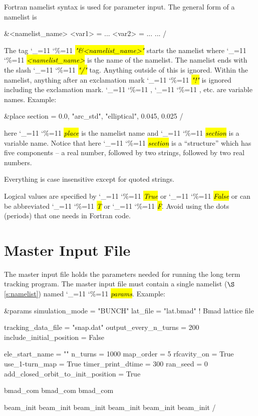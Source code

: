 \documentclass{hitec}
\newcommand\dottcmd[1]{\hl{\em#1}\endgroup}
\newcommand{\vn}{\begingroup\catcode`\_=11 \catcode`\%=11 \dottcmd}
\newcommand{\sref}[1]{$\S$\ref{#1}}
\newcommand{\Section}[1]{\section{#1}\vspace*{-1ex}}
\begin{document}
{{Fortran namelist syntax is used for parameter input. The
general form of a namelist is
\begin{code}
&<namelist_name>
  <var1> = ...
  <var2> = ...
  ...
/
\end{code}
The tag \vn{"\&<namelist_name>"} starts the namelist where
\vn{<namelist_name>} is the name of the namelist. The namelist ends
with the slash \vn{"/"} tag. Anything outside of this is
ignored. Within the namelist, anything after an exclamation mark
\vn{"!"} is ignored including the exclamation mark. \vn{<var1>},
\vn{<var2>}, etc. are variable names. Example:
\begin{code}
&place 
  section = 0.0, "arc_std", "elliptical", 0.045, 0.025 
/
\end{code}
here \vn{place} is the namelist name and \vn{section} is a
variable name.  Notice that here \vn{section} is a ``structure'' which
has five components -- a real number, followed by two strings,
followed by two real numbers.

Everything is case insensitive except for quoted strings.

Logical values are specified by \vn{True} or \vn{False} or can be
abbreviated \vn{T} or \vn{F}. Avoid using the dots (periods) that one
needs in Fortran code.

\Section{Master Input File}
\label{s:input}

The master input file holds the parameters needed for running the long term tracking program. The
master input file must contain a single namelist (\sref{s:namelist}) named \vn{params}.  Example:
\begin{code}
&params
  simulation_mode = "BUNCH"
  lat_file   =  "lat.bmad"     ! Bmad lattice file

  tracking_data_file  = "snap.dat"
  output_every_n_turns = 200
  include_initial_position = False

  ele_start_name     = ""
  n_turns            = 1000
  map_order          = 5
  rfcavity_on        = True
  use_1-turn_map     = True
  timer_print_dtime  = 300
  ran_seed           = 0
  add_closed_orbit_to_init_position = True

  bmad_com%
  bmad_com%
  bmad_com%

  beam_init%
  beam_init%
  beam_init%
  beam_init%
  beam_init%
  beam_init%
/
\end{code}

}}
\end{document}

